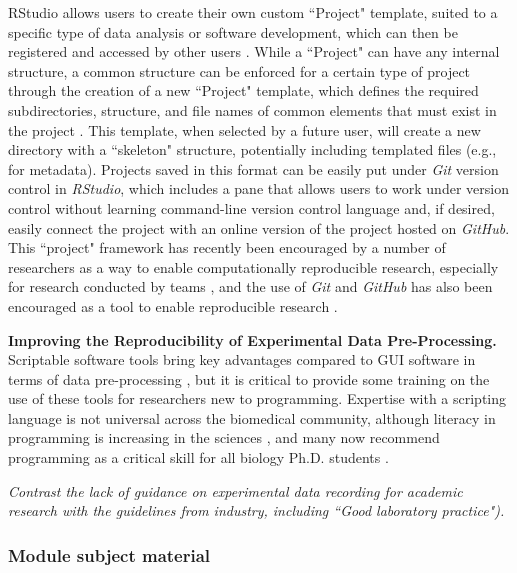 \documentclass[pdftex,english,11pt,parskip=half]{scrartcl}
\begin{document}
RStudio allows users to create their own custom ``Project" template, suited to a specific type of data analysis or software development, which can then be registered and accessed by other users \cite{rstudioprojecttemplate}. While a ``Project" can have any internal structure, a common structure can be enforced for a certain type of project through the creation of a new ``Project" template, which defines the required subdirectories, structure, and file names of common elements that must exist in the project \cite{rstudioprojecttemplate}. This template, when selected by a future user, will create a new directory with a ``skeleton" structure, potentially including templated files (e.g., for metadata). Projects saved in this format can be easily put under \textit{Git} version control in \textit{RStudio}, which includes a pane that allows users to work under version control without learning command-line version control language and, if desired, easily connect the project with an online version of the project hosted on \textit{GitHub}. This ``project" framework has recently been encouraged by a number of researchers as a way to enable computationally reproducible research, especially for research conducted by teams \cite{marwick2017packaging, parker2017opinionated, lowndes2017our}, and the use of \textit{Git} and \textit{GitHub} has also been encouraged as a tool to enable reproducible research \cite{piccolo2016tools, ram2013git, bryan2017excuse, lowndes2017our, cetinkaya2017infrastructure}.  

\textbf{Improving the Reproducibility of Experimental Data Pre-Processing.} Scriptable software tools bring key advantages compared to GUI software in terms of data pre-processing \cite{cetinkaya2017infrastructure, huber2015orchestrating, preeyanon2014reproducible, piccolo2016tools}, but it is critical to provide some training on the use of these tools for researchers new to programming. Expertise with a scripting language is not universal across the biomedical community, although literacy in programming is increasing in the sciences \cite{ram2013git}, and many now recommend programming as a critical skill for all biology Ph.D. students \cite{list2017ten}. 

\textit{Contrast the lack of guidance on experimental data recording for academic research with the guidelines from industry, including ``Good laboratory practice").}

\subsubsection{Module subject material}
\end{document}
